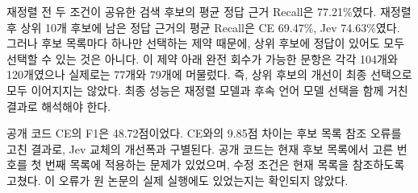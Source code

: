 재정렬 전 두 조건이 공유한 검색 후보의 평균 정답 근거 Recall은 77.21\%였다. 재정렬 후 상위 10개 후보에 남은 정답 근거의 평균 Recall은 CE 69.47\%, Jev 74.63\%였다. 그러나 후보 목록마다 하나만 선택하는 제약 때문에, 상위 후보에 정답이 있어도 모두 선택할 수 있는 것은 아니다. 이 제약 아래 완전 회수가 가능한 문항은 각각 104개와 120개였으나 실제로는 77개와 79개에 머물렀다. 즉, 상위 후보의 개선이 최종 선택으로 모두 이어지지는 않았다. 최종 성능은 재정렬 모델과 후속 언어 모델 선택을 함께 거친 결과로 해석해야 한다.

공개 코드 CE의 F1은 48.72점이었다. CE와의 9.85점 차이는 후보 목록 참조 오류를 고친 결과로, Jev 교체의 개선폭과 구별된다. 공개 코드는 현재 후보 목록에서 고른 번호를 첫 번째 목록에 적용하는 문제가 있었으며, 수정 조건은 현재 목록을 참조하도록 고쳤다. 이 오류가 원 논문의 실제 실행에도 있었는지는 확인되지 않았다.
